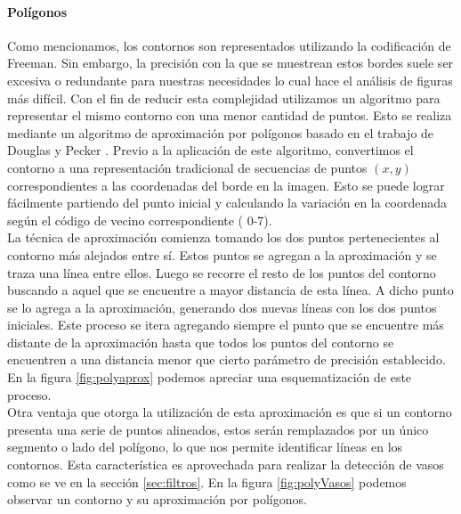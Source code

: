 		
	\paragraph{Polígonos}
	Como mencionamos, los contornos son representados utilizando la codificación de Freeman. Sin embargo, la precisión con la que se muestrean estos bordes suele ser excesiva o redundante para nuestras
	necesidades lo cual hace el análisis de figuras más difícil. Con el fin de reducir esta complejidad utilizamos un algoritmo
	para representar el mismo contorno con una menor cantidad de puntos. Esto se realiza mediante un algoritmo de aproximación por polígonos
	basado en el trabajo de Douglas y Pecker \cite{dp74}. Previo a la aplicación de este algoritmo, convertimos el contorno a una representación
	tradicional de secuencias de puntos $(x,y)$ correspondientes a las 
	coordenadas del borde en la imagen. Esto se puede lograr fácilmente partiendo del punto inicial y calculando la variación en la coordenada según el código de vecino correspondiente ( 0-7).\\
	\indent La técnica de aproximación comienza tomando los dos puntos 
	pertenecientes al contorno más alejados entre sí. Estos puntos se 
	agregan a la aproximación y se traza una línea entre ellos.
	Luego se recorre el resto de los puntos del contorno buscando a aquel 
	que se encuentre a mayor distancia de esta línea. A dicho punto se lo 
	agrega a la aproximación, generando dos nuevas líneas con los dos puntos iniciales. Este proceso se itera agregando siempre el punto que se encuentre más distante de la aproximación hasta que todos los puntos del contorno se encuentren a una distancia menor que cierto parámetro 
	de precisión establecido. En la figura \ref{fig:polyaprox} podemos 
	apreciar una esquematización de este proceso.\\
	\indent Otra ventaja que 
	otorga la utilización de esta aproximación es que si un contorno 
	presenta una serie de puntos alineados, estos serán remplazados por 
	un único segmento o lado del polígono, lo que nos permite 
	identificar líneas en los contornos. Esta característica es 
	aprovechada para realizar la detección de vasos como se ve en la  
	sección \ref{sec:filtros}. En la figura \ref{fig:polyVasos} podemos observar un contorno
	y su aproximación por polígonos.
	
